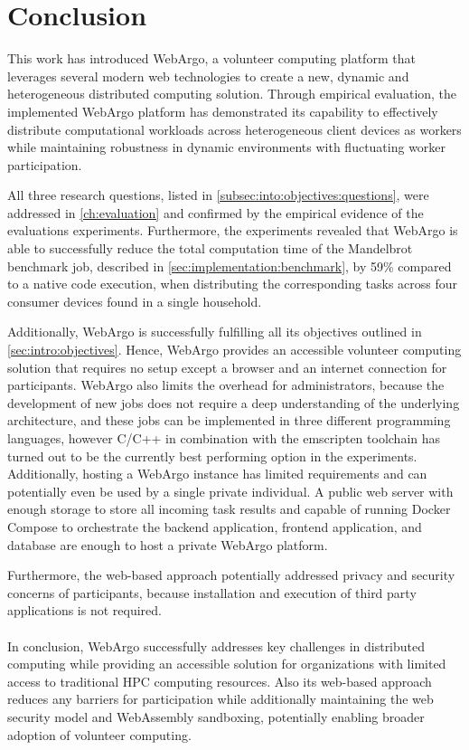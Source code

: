\chapter{Conclusion}
\label{ch:conclusion}
This work has introduced WebArgo, a volunteer computing platform that leverages several modern web technologies to create a new, dynamic and heterogeneous distributed computing solution. Through empirical evaluation, the implemented WebArgo platform has demonstrated its capability to effectively distribute computational workloads across heterogeneous client devices as workers while maintaining robustness in dynamic environments with fluctuating worker participation. 

All three research questions, listed in \autoref{subsec:into:objectives:questions}, were addressed in \autoref{ch:evaluation} and confirmed by the empirical evidence of the evaluations experiments. Furthermore, the experiments revealed that WebArgo is able to successfully reduce the total computation time of the Mandelbrot benchmark job, described in \autoref{sec:implementation:benchmark}, by 59\% compared to a native code execution, when distributing the corresponding tasks across four consumer devices found in a single household.

Additionally, WebArgo is successfully fulfilling all its objectives outlined in \autoref{sec:intro:objectives}. Hence, WebArgo provides an accessible volunteer computing solution that requires no setup except a browser and an internet connection for participants.  WebArgo also limits the overhead for administrators, because the development of new jobs does not require a deep understanding of the underlying architecture, and these jobs can be implemented in three different programming languages, however C/C++ in combination with the emscripten \cite{methodology:emcc} toolchain has turned out to be the currently best performing option in the experiments. Additionally, hosting a WebArgo instance has limited requirements and can potentially even be used by a single private individual. A public web server with enough storage to store all incoming task results and capable of running Docker Compose \cite{conclusion:docker} to orchestrate the backend application, frontend application, and database are enough to host a private WebArgo platform.

Furthermore, the web-based approach potentially addressed privacy and security concerns of participants, because installation and execution of third party applications is not required.
\\~\\
In conclusion, WebArgo successfully addresses key challenges in distributed computing while providing an accessible solution for organizations with limited access to traditional \ac{HPC} computing resources. Also its web-based approach reduces any barriers for participation while additionally maintaining the web security model and WebAssembly sandboxing, potentially enabling broader adoption of volunteer computing.


